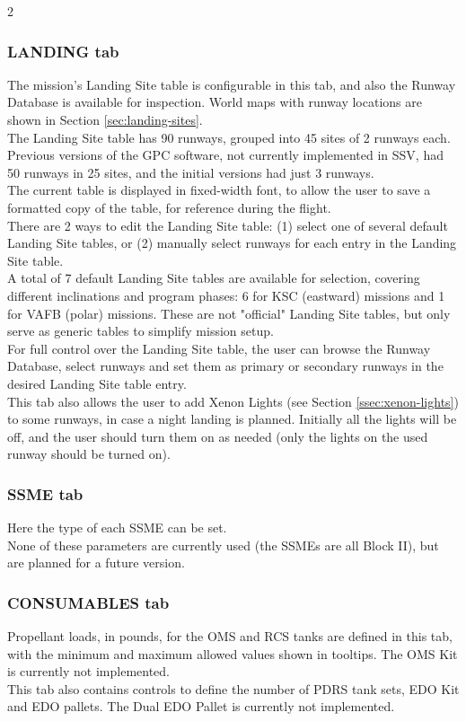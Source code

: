 \documentclass[Space_Shuttle_Vessel_Manual.tex]{subfiles}
\begin{document}
\begin{multicols*}{2}
\subsubsection{LANDING tab}
The mission's Landing Site table is configurable in this tab, and also the Runway Database is available for inspection. World maps with runway locations are shown in Section \ref{sec:landing-sites}.\\
The Landing Site table has 90 runways, grouped into 45 sites of 2 runways each. Previous versions of the GPC software, not currently implemented in SSV, had 50 runways in 25 sites, and the initial versions had just 3 runways.\\
The current table is displayed in fixed-width font, to allow the user to save a formatted copy of the table, for reference during the flight.\\
There are 2 ways to edit the Landing Site table: (1) select one of several default Landing Site tables, or (2) manually select runways for each entry in the Landing Site table.\\
A total of 7 default Landing Site tables are available for selection, covering different inclinations and program phases: 6 for KSC (eastward) missions and 1 for VAFB (polar) missions. These are not "official" Landing Site tables, but only serve as generic tables to simplify mission setup.\\
For full control over the Landing Site table, the user can browse the Runway Database, select runways and set them as primary or secondary runways in the desired Landing Site table entry.\\
This tab also allows the user to add Xenon Lights (see Section \ref{ssec:xenon-lights}) to some runways, in case a night landing is planned. Initially all the lights will be off, and the user should turn them on as needed (only the lights on the used runway should be turned on).


\subsubsection{SSME tab}
Here the type of each SSME can be set.\\
None of these parameters are currently used (the SSMEs are all Block II), but are planned for a future version.


\subsubsection{CONSUMABLES tab}
Propellant loads, in pounds, for the OMS and RCS tanks are defined in this tab, with the minimum and maximum allowed values shown in tooltips. The OMS Kit is currently not implemented.\\
This tab also contains controls to define the number of PDRS tank sets, EDO Kit and EDO pallets. The Dual EDO Pallet is currently not implemented.



\end{multicols*}
\end{document}
